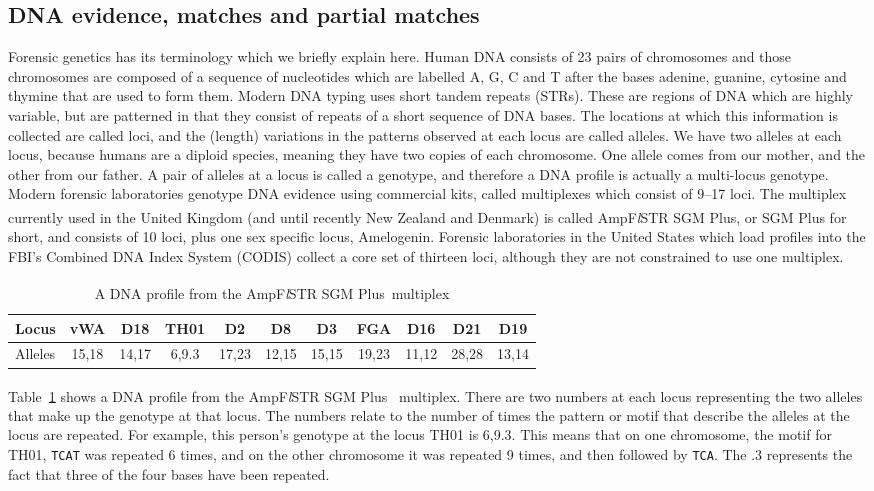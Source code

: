\documentclass[a4paper,11pt]{article}
\newcommand{\SGMplus}{AmpF\textit{l}STR\textsuperscript{\textregistered}
  SGM Plus\textsuperscript{\texttrademark}}
\begin{document}
\subsection[Matches and partial matches]{DNA evidence, matches and partial matches}
\label{sec:dna-matches-partial}
Forensic genetics has its terminology which we briefly explain here. 
Human DNA consists of 23 pairs of chromosomes and those
chromosomes are composed of a sequence of nucleotides which are
labelled A, G, C and T after the bases adenine, guanine, cytosine and
thymine that are used to form them. Modern DNA typing uses short
tandem repeats (STRs). These are regions of DNA which are highly
variable, but are patterned in that they consist of repeats of a short
sequence of DNA bases. The locations at which this information is
collected are called loci, and the (length) variations in the patterns
observed at each locus are called alleles. We have two alleles at each
locus, because humans are a diploid species, meaning they have two
copies of each chromosome. One allele comes from our mother, and the
other from our father. A pair of alleles at a locus is called a
genotype, and therefore a DNA profile is actually a multi-locus genotype.
Modern forensic laboratories genotype DNA evidence using commercial kits,
called multiplexes which consist of 9--17 loci. The multiplex currently
used in the United Kingdom (and until recently New Zealand and
Denmark) is called \SGMplus, or SGM Plus for short, and consists of 10 loci, plus one sex
specific locus, Amelogenin. Forensic laboratories in the United States
which load profiles into the FBI's Combined DNA Index System (CODIS) collect a
core set of thirteen loci, although they are not constrained to use
one multiplex.

\begin{table}[h]
  \centering
  \begin{tabular}{l*{10}{c}}
    \toprule
    Locus & vWA & D18 & TH01 & D2 & D8 & D3 & FGA & D16 & D21 & D19 \\
    \midrule
    Alleles & 15,18 & 14,17 &  6,9.3 & 17,23 & 12,15 & 15,15 & 19,23 & 11,12 & 28,28
    & 13,14\\
    \bottomrule
  \end{tabular}
  \caption{A DNA profile from the \SGMplus~multiplex}
  \label{tab:prof}
\end{table}

Table~\ref{tab:prof} shows a DNA profile from the \SGMplus~ multiplex.
There are two numbers at each locus representing the two alleles that
make up the genotype at that locus. The numbers relate to the number
of times the pattern or motif that describe the alleles at the locus
are repeated. For example, this person's genotype at the locus TH01 is
6,9.3. This means that on one chromosome, the motif for TH01,
\texttt{TCAT} was repeated 6 times, and on the other chromosome it was
repeated 9 times, and then followed by \texttt{TCA}. The .3 represents
the fact that three of the four bases have been repeated.
\end{document}
